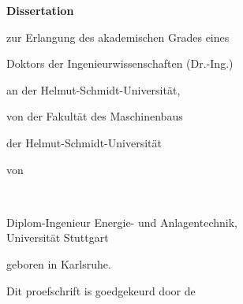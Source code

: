 \begin{titlepage}
\begin{center}


\vspace*{2\bigskipamount}

{\makeatletter
\titlestyle\bfseries\LARGE\@title
\makeatother}

{\makeatletter
    \bigskip
    \titlefont\titleshape\Large\@subtitle
\makeatother}

\vfill


{\Large\bfseries Dissertation}

\bigskip
\bigskip

zur Erlangung des akademischen Grades eines

Doktors der Ingenieurwissenschaften (Dr.-Ing.)

an der Helmut-Schmidt-Universität,

von der Fakultät des Maschinenbaus

der Helmut-Schmidt-Universität

\bigskip
\bigskip

von

\bigskip
\bigskip

\makeatletter
{\Large\titlefont\bfseries\@firstname\ {\titleshape\@lastname}}
\makeatother

\bigskip
\bigskip

Diplom-Ingenieur Energie- und Anlagentechnik, \\
Universität Stuttgart

geboren in Karlsruhe.

\vspace*{2\bigskipamount}

\end{center}

\clearpage
\thispagestyle{empty}

\noindent Dit proefschrift is goedgekeurd door de


\end{titlepage}
